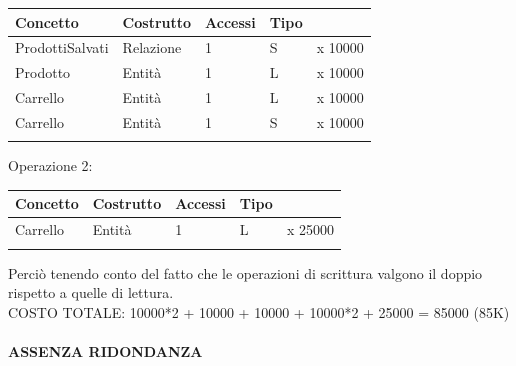 \documentclass[11pt]{article}
\begin{document}
\newcommand{\noline}[1]{\multicolumn{1}{c}{#1}}
\newcommand{\myline}{\cline{1-4}}
\begin{center}
    \begin{tabularx}{0.98\textwidth} {
        | >{\raggedright\arraybackslash}X |
        >{\raggedright\arraybackslash}X |
        >{\raggedright\arraybackslash}X |
        >{\raggedright\arraybackslash}X |
        c                               |
    }

        \myline
        \textbf{Concetto} & \textbf{Costrutto} & \textbf{Accessi} & \textbf{Tipo} \\
        \myline

        ProdottiSalvati &
        Relazione &
        1 &
        S &
        \noline{x 10000} \\
        \myline

        Prodotto &
        Entità &
        1 &
        L &
        \noline{x 10000} \\
        \myline

        Carrello &
        Entità &
        1 &
        L &
        \noline{x 10000} \\
        \myline

        Carrello &
        Entità &
        1 &
        S &
        \noline{x 10000} \\
        \myline
    \end{tabularx}
\end{center}
Operazione 2:
\begin{center}
    \begin{tabularx}{0.98\textwidth} {
        | >{\raggedright\arraybackslash}X |
        >{\raggedright\arraybackslash}X |
        >{\raggedright\arraybackslash}X |
        >{\raggedright\arraybackslash}X |
        c                               |
    }

        \myline
        \textbf{Concetto} & \textbf{Costrutto} & \textbf{Accessi} & \textbf{Tipo} \\
        \myline

        Carrello &
        Entità &
        1 &
        L &
        \noline{x 25000} \\
        \myline
    \end{tabularx}
\end{center}
Perciò tenendo conto del fatto che le operazioni di scrittura valgono il doppio rispetto a quelle di lettura.\\
COSTO TOTALE: 10000*2 + 10000 + 10000 + 10000*2 + 25000 = 85000 (85K)\\\\
\textbf{ASSENZA RIDONDANZA}
\end{document}
